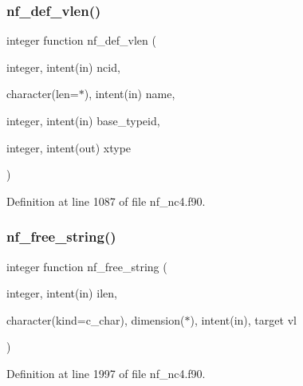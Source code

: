 \mbox{\label{nf__nc4_8f90_a6cb82d26e8a2698ba9a018b38c70dad9}} 
\subsubsection{\texorpdfstring{nf\+\_\+def\+\_\+vlen()}{nf\_def\_vlen()}}
{\footnotesize\ttfamily integer function nf\+\_\+def\+\_\+vlen (\begin{DoxyParamCaption}\item[{integer, intent(in)}]{ncid,  }\item[{character(len=$\ast$), intent(in)}]{name,  }\item[{integer, intent(in)}]{base\+\_\+typeid,  }\item[{integer, intent(out)}]{xtype }\end{DoxyParamCaption})}



Definition at line 1087 of file nf\+\_\+nc4.\+f90.

\mbox{\label{nf__nc4_8f90_a361be5beca04898ff8116a83228a123d}} 
\subsubsection{\texorpdfstring{nf\+\_\+free\+\_\+string()}{nf\_free\_string()}}
{\footnotesize\ttfamily integer function nf\+\_\+free\+\_\+string (\begin{DoxyParamCaption}\item[{integer, intent(in)}]{ilen,  }\item[{character(kind=c\+\_\+char), dimension($\ast$), intent(in), target}]{vl }\end{DoxyParamCaption})}



Definition at line 1997 of file nf\+\_\+nc4.\+f90.

\mbox{\label{nf__nc4_8f90_a783c560e5fe8b1b284b9c54b0cdba166}} 
